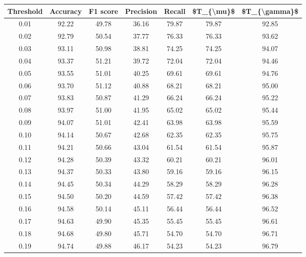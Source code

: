 \begin{tabular}{|c|c|c|c|c|c|c|}
\hline
 Threshold &  Accuracy &  F1 score &  Precision &  Recall &  \$T\_\{\textbackslash mu\}\$ &  \$T\_\{\textbackslash gamma\}\$ \\
\hline
      0.01 &     92.22 &     49.78 &      36.16 &   79.87 &      79.87 &         92.85 \\
      0.02 &     92.79 &     50.54 &      37.77 &   76.33 &      76.33 &         93.62 \\
      0.03 &     93.11 &     50.98 &      38.81 &   74.25 &      74.25 &         94.07 \\
      0.04 &     93.37 &     51.21 &      39.72 &   72.04 &      72.04 &         94.46 \\
      0.05 &     93.55 &     51.01 &      40.25 &   69.61 &      69.61 &         94.76 \\
      0.06 &     93.70 &     51.12 &      40.88 &   68.21 &      68.21 &         95.00 \\
      0.07 &     93.83 &     50.87 &      41.29 &   66.24 &      66.24 &         95.22 \\
      0.08 &     93.97 &     51.00 &      41.95 &   65.02 &      65.02 &         95.44 \\
      0.09 &     94.07 &     51.01 &      42.41 &   63.98 &      63.98 &         95.59 \\
      0.10 &     94.14 &     50.67 &      42.68 &   62.35 &      62.35 &         95.75 \\
      0.11 &     94.21 &     50.66 &      43.04 &   61.54 &      61.54 &         95.87 \\
      0.12 &     94.28 &     50.39 &      43.32 &   60.21 &      60.21 &         96.01 \\
      0.13 &     94.37 &     50.33 &      43.80 &   59.16 &      59.16 &         96.15 \\
      0.14 &     94.45 &     50.34 &      44.29 &   58.29 &      58.29 &         96.28 \\
      0.15 &     94.50 &     50.20 &      44.59 &   57.42 &      57.42 &         96.38 \\
      0.16 &     94.58 &     50.14 &      45.11 &   56.44 &      56.44 &         96.52 \\
      0.17 &     94.63 &     49.90 &      45.35 &   55.45 &      55.45 &         96.61 \\
      0.18 &     94.68 &     49.80 &      45.71 &   54.70 &      54.70 &         96.71 \\
      0.19 &     94.74 &     49.88 &      46.17 &   54.23 &      54.23 &         96.79 \\

\end{tabular}
